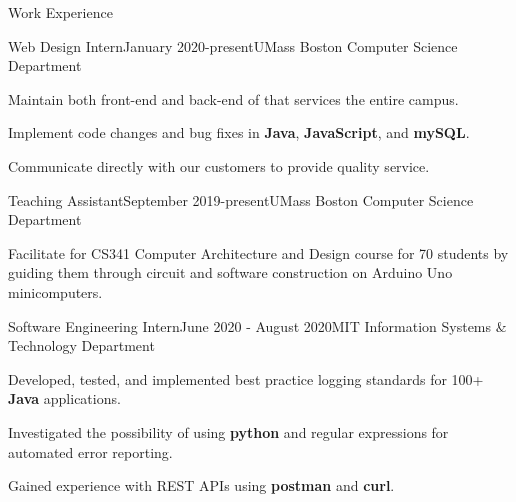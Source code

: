 \documentclass{resume} %
\begin{document}
\begin{Section}{Work Experience}
	
	\begin{Job}{Web Design Intern}{January 2020-present}{UMass Boston Computer Science Department}
			\item Maintain both front-end and back-end of  that services the entire campus.
			\item Implement code changes and bug fixes in \textbf{Java}, \textbf{JavaScript}, and \textbf{mySQL}.
			\item Communicate directly with our customers to provide quality service.
	\end{Job}
	
	\begin{Job}{Teaching Assistant}{September 2019-present}{UMass Boston Computer Science Department}
			\item Facilitate  for CS341 Computer Architecture and Design course for 70 students by guiding them through circuit and software construction on Arduino Uno minicomputers.
	\end{Job}
	
	\begin{Job}{Software Engineering Intern}{June 2020 - August 2020}{MIT Information Systems \& Technology Department}
	\item Developed, tested, and implemented best practice logging standards for 100+ \textbf{Java} applications.
	\item Investigated the possibility of using \textbf{python} and regular expressions for automated error reporting. 
	\item Gained experience with REST APIs using \textbf{postman} and \textbf{curl}.
\end{Job}
	

\end{Section}
\end{document}
